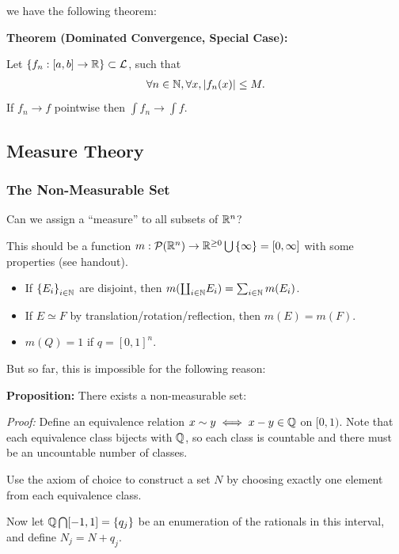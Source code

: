 we have the following theorem:

\textbf{Theorem (Dominated Convergence, Special Case):}

Let \(\left\{{f_n:[a,b] \to {\mathbb{R}}}\right\} \subset \mathcal L\), such that
\begin{align*}
\forall n\in {\mathbb{N}}, \forall x, {\left\lvert {f_n(x)} \right\rvert} \leq M.
\end{align*} If \(f_n \to f\) pointwise then \(\int f_n \to \int f\).

\hypertarget{measure-theory}{%
\subsection{Measure Theory}\label{measure-theory}}

\hypertarget{the-non-measurable-set}{%
\subsubsection{The Non-Measurable Set}\label{the-non-measurable-set}}

Can we assign a ``measure'' to all subsets of \({\mathbb{R}}^n\)?

This should be a function
\(m: \mathcal P({\mathbb{R}}^n) \to {\mathbb{R}}^{\geq 0} \bigcup \left\{{\infty}\right\} = [0, \infty]\)
with some properties (see handout).

\begin{itemize}
\item
  If \(\left\{{E_i}\right\}_{i\in {\mathbb{N}}}\) are disjoint, then
  \(m({\coprod}_{i\in {\mathbb{N}}} E_i) = \sum_{i\in{\mathbb{N}}} m(E_i)\).
\item
  If \(E \simeq F\) by translation/rotation/reflection, then
  \(m(E) = m(F)\).
\item
  \(m(Q) = 1\) if \(q = [0, 1]^n\).
\end{itemize}

But so far, this is impossible for the following reason:

\textbf{Proposition:} There exists a non-measurable set:

\emph{Proof:} Define an equivalence relation
\(x\sim y \iff x-y \in {\mathbb{Q}}\) on \([0, 1)\). Note that each equivalence
class bijects with \({\mathbb{Q}}\), so each class is countable and there must be
an uncountable number of classes.

Use the axiom of choice to construct a set \(N\) by choosing exactly one
element from each equivalence class.

Now let \({\mathbb{Q}} \bigcap [-1, 1] = \left\{{q_j}\right\}\) be an enumeration of
the rationals in this interval, and define \(N_j = N + q_j\).

